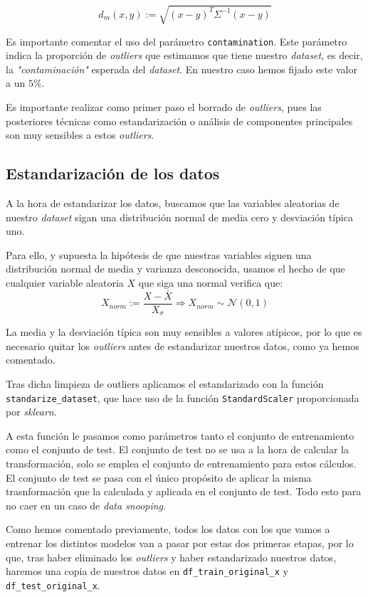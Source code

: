 \documentclass[11pt]{article}
\begin{document}
$$d_m(x, y) := \sqrt{(x - y)^T \Sigma^{-1} (x - y)}$$

Es importante comentar el uso del parámetro \lstinline{contamination}. Este parámetro indica la proporción de \emph{outliers} que estimamos que tiene nuestro \emph{dataset}, es decir, la \emph{"contaminación"} esperada del \emph{dataset}. En nuestro caso hemos fijado este valor a un $5\%$.

Es importante realizar como primer paso el borrado de \emph{outliers}, pues las posteriores técnicas como estandarización o análisis de componentes principales son muy sensibles a estos \emph{outliers}.

\subsection{Estandarización de los datos}

A la hora de estandarizar los datos, buscamos que las variables aleatorias de nuestro \emph{dataset} sigan una distribución normal de media cero y desviación típica uno.

Para ello, y supuesta la hipótesis de que nuestras variables siguen una distribución normal de media y varianza desconocida, usamos el hecho de que cualquier variable aleatoria $X$ que siga una normal verifica que:
$$X_{norm} := \frac{{X- \bar{X}}}{X_{\sigma}} \Longrightarrow X_{norm} \sim \mathcal{N}(0, 1)$$

La media y la desviación típica son muy sensibles a valores atípicos, por lo que es necesario quitar los \emph{outliers} antes de estandarizar nuestros datos, como ya hemos comentado.

Tras dicha limpieza de outliers aplicamos el estandarizado con la función \lstinline{standarize_dataset}, que hace uso de la función \lstinline{StandardScaler} proporcionada por \emph{sklearn}.

A esta función le pasamos como parámetros tanto el conjunto de entrenamiento como el conjunto de test. El conjunto de test no se usa a la hora de calcular la transformación, solo se emplea el conjunto de entrenamiento para estos cálculos. El conjunto de test se pasa con el único propósito de aplicar la misma trasnformación que la calculada y aplicada en el conjunto de test. Todo esto para no caer en un caso de \emph{data snooping}.

Como hemos comentado previamente, todos los datos con los que vamos a entrenar los distintos modelos van a pasar por estas dos primeras etapas, por lo que, tras haber eliminado los \emph{outliers} y haber estandarizado nuestros datos, haremos una copia de nuestros datos en \lstinline{df_train_original_x} y \lstinline{df_test_original_x}.
\end{document}
